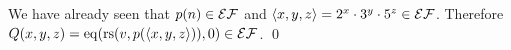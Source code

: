 
\begin{pf} \rm
 We have already seen that $p(n)\in\mathcal{EF}$ and
 $\langle x, y, z\rangle = 2^x\cdot 3^y\cdot 5^z \in\mathcal{EF}$.
 Therefore $Q(x, y, z) = \mathrm{eq}(\mathrm{rs}(v, p(\langle x, y, z\rangle)), 0) \in\mathcal{EF}$. \qed
\end{pf}

